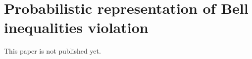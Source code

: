 \chapter{Probabilistic representation of Bell inequalities violation}

This paper is not published yet.
